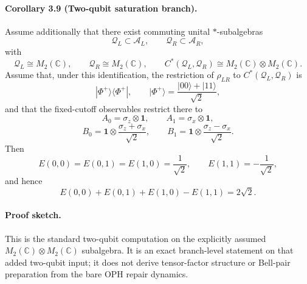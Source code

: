 \paragraph{\textbf{Corollary 3.9 (Two-qubit saturation branch).}}
Assume additionally that there exist commuting unital \(*\)-subalgebras
\[
\mathcal Q_L\subset \mathcal A_L,
\qquad
\mathcal Q_R\subset \mathcal A_R,
\]
with
\[
\mathcal Q_L\cong M_2(\mathbb C),
\qquad
\mathcal Q_R\cong M_2(\mathbb C),
\qquad
C^*(\mathcal Q_L,\mathcal Q_R)\cong M_2(\mathbb C)\otimes M_2(\mathbb C).
\]
Assume that, under this identification, the restriction of \(\rho_{LR}\) to
\(C^*(\mathcal Q_L,\mathcal Q_R)\) is
\[
|\Phi^+\rangle\!\langle\Phi^+|,
\qquad
|\Phi^+\rangle=\frac{|00\rangle+|11\rangle}{\sqrt2},
\]
and that the fixed-cutoff observables restrict there to
\[
A_0=\sigma_z\otimes \mathbf 1,
\qquad
A_1=\sigma_x\otimes \mathbf 1,
\]
\[
B_0=\mathbf 1\otimes \frac{\sigma_z+\sigma_x}{\sqrt2},
\qquad
B_1=\mathbf 1\otimes \frac{\sigma_z-\sigma_x}{\sqrt2}.
\]
Then
\[
E(0,0)=E(0,1)=E(1,0)=\frac{1}{\sqrt2},
\qquad
E(1,1)=-\frac{1}{\sqrt2},
\]
and hence
\[
E(0,0)+E(0,1)+E(1,0)-E(1,1)=2\sqrt2.
\]

\paragraph{\textbf{Proof sketch.}}
This is the standard two-qubit computation on the explicitly assumed
\(M_2(\mathbb C)\otimes M_2(\mathbb C)\) subalgebra. It is an exact branch-level statement
on that added two-qubit input; it does not derive tensor-factor structure or Bell-pair
preparation from the bare OPH repair dynamics.
